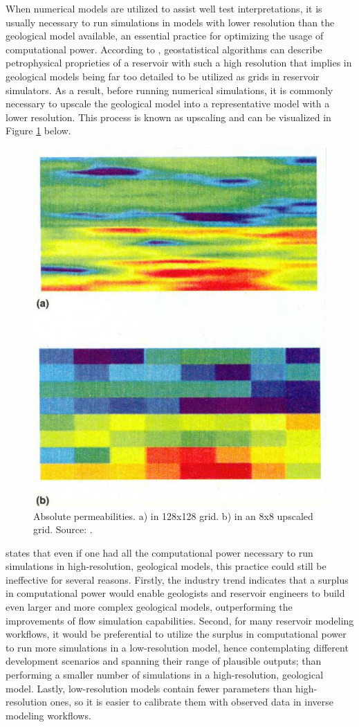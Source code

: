 When numerical models are utilized to assist well test interpretations, it is usually necessary to run simulations in models with lower resolution than the geological model available, an essential practice for optimizing the usage of computational power.
%
According to \cite{Christie1996}, geostatistical algorithms can describe petrophysical proprieties of a reservoir with such a high resolution that implies in geological models being far too detailed to be utilized as grids in reservoir simulators.
%
As a result, before running numerical simulations, it is commonly necessary to upscale the geological model into a representative model with a lower resolution.
%
This process is known as upscaling and can be visualized in Figure \ref{figure-permeability-upscaling} below.
\begin{figure}[H]
	\centering 
	\includegraphics[width=0.5\linewidth]{Images/figure-permeability-upscaling}
	\caption{Absolute permeabilities. a) in 128x128 grid. b) in an 8x8 upscaled grid. Source: \cite{Christie1996}.}
	\label{figure-permeability-upscaling}
\end{figure}

\cite{Lie2015} states that even if one had all the computational power necessary to run simulations in high-resolution, geological models, this practice could still be ineffective for several reasons.
%
Firstly, the industry trend indicates that a surplus in computational power would enable geologists and reservoir engineers to build even larger and more complex geological models, outperforming the improvements of flow simulation capabilities.
%
Second, for many reservoir modeling workflows, it would be preferential to utilize the surplus in computational power to run more simulations in a low-resolution model, hence contemplating different development scenarios and spanning their range of plausible outputs; than performing a smaller number of simulations in a high-resolution, geological model.
%
Lastly, low-resolution models contain fewer parameters than high-resolution ones, so it is easier to calibrate them with observed data in inverse modeling workflows.

